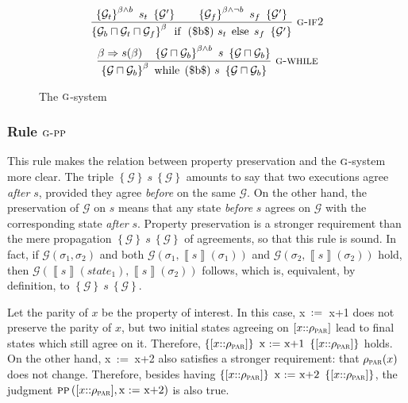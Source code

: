 \documentclass[prodmode,acmtocl]{acmsmall}
\def\state{\ensuremath{\sigma}\xspace}
\def\uco{\ensuremath{\rho}\xspace}
\newcommand{\0}{\mbox{\bf 0}}
\newcommand{\CODE}[1]{\ensuremath{\mbox{\lstinline!#1!}\xspace}\xspace}
\newcommand{\SEMANTICS}[1]{\left\llbracket #1 \right\rrbracket}
\newcommand{\IMPASSIGN}[2]{#1\ \CODE{:=}\ #2}
\def\PARDOM{\ensuremath{\uco_{\textsc{par}}}\xspace}
\def\PRED{\beta}
\def\AGREEM{\mathcal{G}}
\newcommand{\AGRS}[2]{[#2{::}#1]}
\newcommand{\RULENAME}[1]{\textsc{#1}}
\newcommand{\GRULENAME}[1]{\textsc{g-#1}}
\newcommand{\GRULE}[3]{\frac{#1}{#2}\ \GRULENAME{#3}}
\newcommand{\GSMTH}[1]{$\RULENAME{g}$-#1}
\def\GSYSTEM{\GSMTH{system}\xspace}
\newcommand{\PRESERVES}[2]{\textsc{pp}\left(#2,#1\right)}
\newcommand{\TRIPLE}[3]{\left\{#1\right\}\ #2\ \left\{#3\right\}}
\newcommand{\TRIPLEB}[4]{\left\{#1\right\}^{#2}\ #3\ \left\{#4\right\}}
\begin{document}
\begin{figure}
\begin{center}
\[      \]
      \[
      \GRULE{\TRIPLEB{\AGREEM_t} {\PRED\wedge b} {s_t} {\AGREEM'}\qquad
        \TRIPLEB{\AGREEM_f} {\PRED\wedge\lnot b} {s_f}
        {\AGREEM'}}{\TRIPLEB{\AGREEM_b\sqcap\AGREEM_t\sqcap\AGREEM_f}{\PRED}
        {\mbox{\CODE{if ($b$) }~$s_t$~\CODE{else}~$s_f$}} {\AGREEM'}}{if2}
      \]
      \[
      \GRULE{\PRED \Rightarrow s(\PRED) \quad
        \TRIPLEB{\AGREEM\sqcap\AGREEM_b}{\PRED\wedge
          b}{s}{\AGREEM\sqcap\AGREEM_b}}
      {\TRIPLEB{\AGREEM\sqcap\AGREEM_b}{\PRED}{
          \mbox{\CODE{while ($b$) }~$s$}}{\AGREEM\sqcap\AGREEM_b}}{while}
      \]
  \end{center}
  \caption{The \GSYSTEM}
  \label{fig:gRules}
\end{figure}



\subsubsection{Rule $\GRULENAME{pp}$}

This rule makes the relation between property preservation and the
\GSYSTEM more clear.  The triple $\TRIPLE{\AGREEM}{s}{\AGREEM}$
amounts to say that two executions agree \emph{after} $s$, provided
they agree \emph{before} on the same $\AGREEM$.  On the other hand,
the preservation of $\AGREEM$ on $s$ means that any state
\emph{before} $s$ agrees on $\AGREEM$ with the corresponding state
\emph{after} $s$.  Property preservation is a stronger requirement
than the mere propagation $\TRIPLE{\AGREEM}{s}{\AGREEM}$ of
agreements, so that this rule is sound.  In fact, if
$\AGREEM(\state_1,\state_2)$ and both
$\AGREEM(\state_1,\SEMANTICS{s}(\state_1))$ and
$\AGREEM(\state_2,\SEMANTICS{s}(\state_2))$ hold, then
$\AGREEM(\SEMANTICS{s}(state_1),\SEMANTICS{s}(\state_2))$ follows,
which is, equivalent, by definition, to
$\TRIPLE{\AGREEM}{s}{\AGREEM}$.

\begin{example}
  Let the parity of $x$ be the property of interest.  In this case,
  \IMPASSIGN{x}{x+1} does not preserve the parity of $x$, but two
  initial states agreeing on $\AGRS{\PARDOM}{x}$ lead to final states
  which still agree on it.  Therefore,
  $\TRIPLE{\AGRS{\PARDOM}{x}}{\mbox{\IMPASSIGN{x}{x+1}}}{\AGRS{\PARDOM}{x}}$
  holds.  On the other hand, \IMPASSIGN{x}{x+2} also satisfies a
  stronger requirement: that $\PARDOM(x)$ does not change.  Therefore,
  besides having
  $\TRIPLE{\AGRS{\PARDOM}{x}}{\mbox{\IMPASSIGN{x}{x+2}}}{\AGRS{\PARDOM}{x}}$,
  the judgment
  $\PRESERVES{\mbox{\IMPASSIGN{x}{x+2}}}{\AGRS{\PARDOM}{x}}$ is also
  true.
\end{example}
\end{document}
